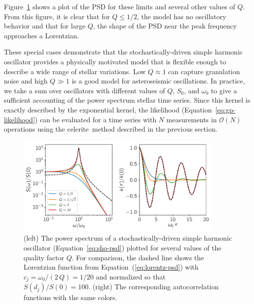 \documentclass[manuscript, letterpaper]{aastex6}
\makeatletter
\let\origsection\section
\renewcommand\section{\@ifstar{\starsection}{\nostarsection}}
\newcommand\nostarsection[1]{\sectionprelude\origsection{#1}}
\newcommand\starsection[1]{\sectionprelude\origsection*{#1}}
\newcommand\sectionprelude{\vspace{1em}}
\newcommand{\project}[1]{\textsf{#1}}
\newcommand{\celerite}{\project{celerite}}
\newcommand{\figureref}[1]{\ref{fig:#1}}
\newcommand{\Figure}[1]{Figure~\figureref{#1}}
\newcommand{\figurelabel}[1]{\label{fig:#1}}
\renewcommand{\eqref}[1]{\ref{eq:#1}}
\newcommand{\Eq}[1]{Equation~(\eqref{#1})}
\newcommand{\eq}[1]{\Eq{#1}}
\newcommand{\eqalt}[1]{Equation~\eqref{#1}}
\makeatother
\begin{document}
\Figure{sho} shows a plot of the PSD for these limits and several other values
of $Q$.
From this figure, it is clear that for $Q \le 1/2$, the model has no
oscillatory behavior and that for large $Q$, the shape of the PSD near the
peak frequency approaches a Lorentzian.

These special cases demonstrate that the stochastically-driven simple harmonic
oscillator provides a physically motivated model that is flexible enough to
describe a wide range of stellar variations.
Low $Q \approx 1$ can capture granulation noise and high $Q \gg 1$ is a good
model for asteroseismic oscillations.
In practice, we take a sum over oscillators with different values of $Q$,
$S_0$, and $\omega_0$ to give a sufficient accounting of the power spectrum
stellar time series.
Since this kernel is exactly described by the exponential kernel, the
likelihood (\eqalt{gp-likelihood}) can be evaluated for a time series with $N$
measurements in $\mathcal{O}(N)$ operations using the \celerite\ method
described in the previous section.

\begin{figure}[!htbp]
\begin{center}
\includegraphics[width=0.9\textwidth]{figures/sho.pdf}
\caption{(left) The power spectrum of a stochastically-driven simple harmonic
    oscillator (\eqalt{sho-psd}) plotted for several values of the quality
    factor $Q$.
    For comparison, the dashed line shows the Lorentzian function from
    \eq{lorentz-psd} with $c_j = \omega_0/(2\,Q) = 1/20$ and normalized so that
    $S(d_j)/S(0) = 100$.
    (right) The corresponding autocorrelation functions with the same colors.
    \figurelabel{sho}}
\end{center}
\end{figure}


\section{Examples with simulated data}
\end{document}
